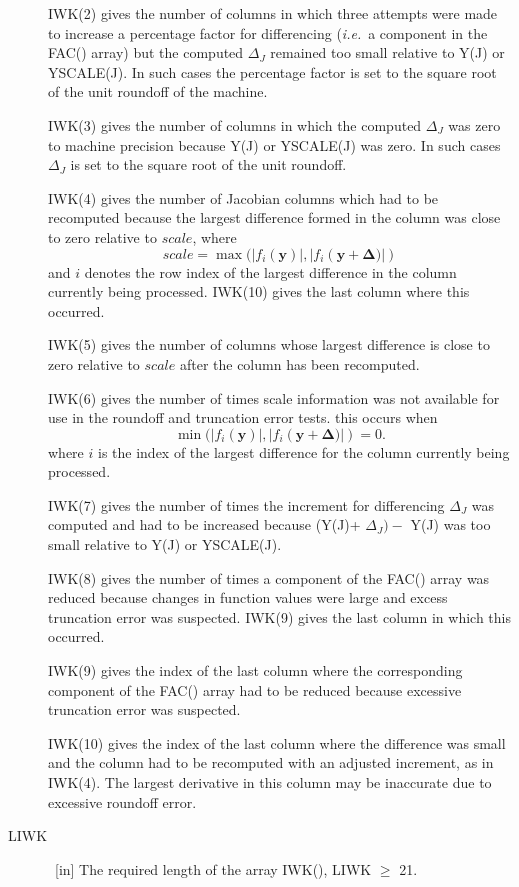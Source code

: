 \documentclass[twoside]{MATH77}
\begin{document}
\begin{description}
  IWK(2) gives the number of columns in which three attempts were made
  to increase a percentage factor for differencing ({\em i.e.}\ a component in the
  FAC() array) but the computed $\Delta_J$ remained too small relative to
  Y(J) or YSCALE(J).  In such cases the percentage factor is set
  to the square root of the unit roundoff of the machine.
  
  IWK(3) gives the number of columns in which the computed $\Delta_J$ was
  zero to machine precision because Y(J) or YSCALE(J) was zero.
  In such cases $\Delta_J$  is set to the square root of the unit roundoff.
  
  IWK(4) gives the number of Jacobian columns which had to be recomputed
  because the largest difference formed in the column was close to zero
  relative to $\mathit{scale}$, where
\begin{equation*}
  \mathit{scale} = \max( |f_i (\mathbf{y})|,|f_i(\mathbf{y}+\bm{\Delta)}|)
\end{equation*}
and $i$ denotes the row index of the largest difference in the column
currently being processed.  IWK(10) gives the last column where this
occurred.

IWK(5) gives the number of columns whose largest difference is close to
zero relative to $\mathit{scale}$ after the column has been recomputed.

IWK(6) gives the number of times scale information was not available for
use in the roundoff and truncation error tests.  this occurs when
\begin{equation*}
  \min (|f_i(\mathbf{y})|,|f_i (\mathbf{y}+\bm{\Delta)}|) = 0.
\end{equation*}
where $i$ is the index of the largest difference for the column currently
being processed.

IWK(7) gives the number of times the increment for differencing $\Delta_J$
was computed and had to be increased because (Y(J)+ $\Delta_J) -$ Y(J) was too
small relative to Y(J) or YSCALE(J).


IWK(8) gives the number of times a component of the FAC() array
was reduced because changes in function values were large and excess
truncation error was suspected. IWK(9) gives the last column in which
this occurred.

IWK(9) gives the index of the last column where the corresponding
component of the FAC() array had to be reduced because excessive
truncation error was suspected.

IWK(10) gives the index of the last column where the difference was
small and the column had to be recomputed with an adjusted increment, as in
IWK(4).  The largest derivative in this column may be inaccurate due to
excessive roundoff error.


\item[LIWK] \ [in] The required length of the array IWK(), LIWK $\geq $
    21.

\end{description}
\end{document}
